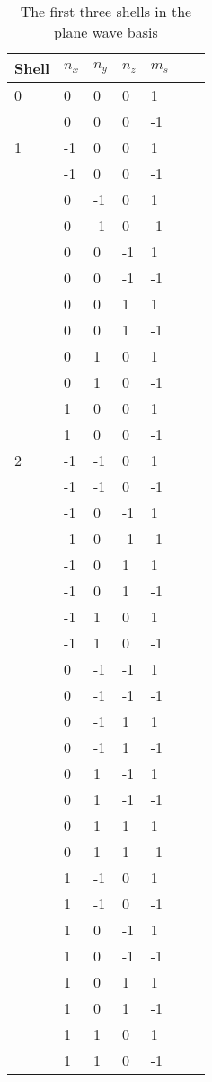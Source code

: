 \begin{table}[]
\centering
\caption{The first three shells in the plane wave basis}
\label{tab:3shell}
\begin{tabular}{lllllll}
Shell & $n_x$ & $n_y$ & $n_z$ & $m_s$ \\ \hline
0 & 0 & 0 & 0 & 1 & \\
 & 0 & 0 & 0 & -1 & \\ \hline
1 & -1 & 0 & 0 & 1 & \\
 & -1 & 0 & 0 & -1 & \\
 & 0 & -1 & 0 & 1 & \\
 & 0 & -1 & 0 & -1 & \\
 & 0 & 0 & -1 & 1 & \\
 & 0 & 0 & -1 & -1 & \\
 & 0 & 0 & 1 & 1 & \\
 & 0 & 0 & 1 & -1 & \\
 & 0 & 1 & 0 & 1 & \\
 & 0 & 1 & 0 & -1 & \\
 & 1 & 0 & 0 & 1 & \\
 & 1 & 0 & 0 & -1 & \\ \hline
2 & -1 & -1 & 0 & 1 & \\
 & -1 & -1 & 0 & -1 & \\
 & -1 & 0 & -1 & 1 & \\
 & -1 & 0 & -1 & -1 & \\
 & -1 & 0 & 1 & 1 & \\
 & -1 & 0 & 1 & -1 & \\
 & -1 & 1 & 0 & 1 & \\
 & -1 & 1 & 0 & -1 & \\
 & 0 & -1 & -1 & 1 & \\
 & 0 & -1 & -1 & -1 & \\
 & 0 & -1 & 1 & 1 & \\
 & 0 & -1 & 1 & -1 & \\
 & 0 & 1 & -1 & 1 & \\
 & 0 & 1 & -1 & -1 & \\
 & 0 & 1 & 1 & 1 & \\
 & 0 & 1 & 1 & -1 & \\
 & 1 & -1 & 0 & 1 & \\
 & 1 & -1 & 0 & -1 & \\
 & 1 & 0 & -1 & 1 & \\
 & 1 & 0 & -1 & -1 & \\
 & 1 & 0 & 1 & 1 & \\
 & 1 & 0 & 1 & -1 & \\
 & 1 & 1 & 0 & 1 & \\
 & 1 & 1 & 0 & -1 & \\
\end{tabular}
\end{table}

